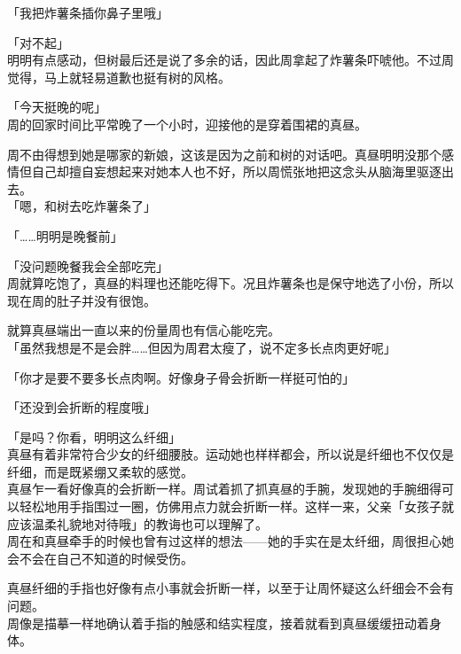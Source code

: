 「我把炸薯条插你鼻子里哦」

「对不起」\\

明明有点感动，但树最后还是说了多余的话，因此周拿起了炸薯条吓唬他。不过周觉得，马上就轻易道歉也挺有树的风格。\\

\vspace{2\baselineskip}

「今天挺晚的呢」\\

周的回家时间比平常晚了一个小时，迎接他的是穿着围裙的真昼。

周不由得想到她是哪家的新娘，这该是因为之前和树的对话吧。真昼明明没那个感情但自己却擅自妄想起来对她本人也不好，所以周慌张地把这念头从脑海里驱逐出去。\\

「嗯，和树去吃炸薯条了」

「……明明是晚餐前」

「没问题晚餐我会全部吃完」\\

周就算吃饱了，真昼的料理也还能吃得下。况且炸薯条也是保守地选了小份，所以现在周的肚子并没有很饱。

就算真昼端出一直以来的份量周也有信心能吃完。\\

「虽然我想是不是会胖……但因为周君太瘦了，说不定多长点肉更好呢」

「你才是要不要多长点肉啊。好像身子骨会折断一样挺可怕的」

「还没到会折断的程度哦」

「是吗？你看，明明这么纤细」\\

真昼有着非常符合少女的纤细腰肢。运动她也样样都会，所以说是纤细也不仅仅是纤细，而是既紧绷又柔软的感觉。\\

真昼乍一看好像真的会折断一样。周试着抓了抓真昼的手腕，发现她的手腕细得可以轻松地用手指围过一圈，仿佛用点力就会折断一样。这样一来，父亲「女孩子就应该温柔礼貌地对待哦」的教诲也可以理解了。\\

周在和真昼牵手的时候也曾有过这样的想法——她的手实在是太纤细，周很担心她会不会在自己不知道的时候受伤。

真昼纤细的手指也好像有点小事就会折断一样，以至于让周怀疑这么纤细会不会有问题。\\

周像是描摹一样地确认着手指的触感和结实程度，接着就看到真昼缓缓扭动着身体。


